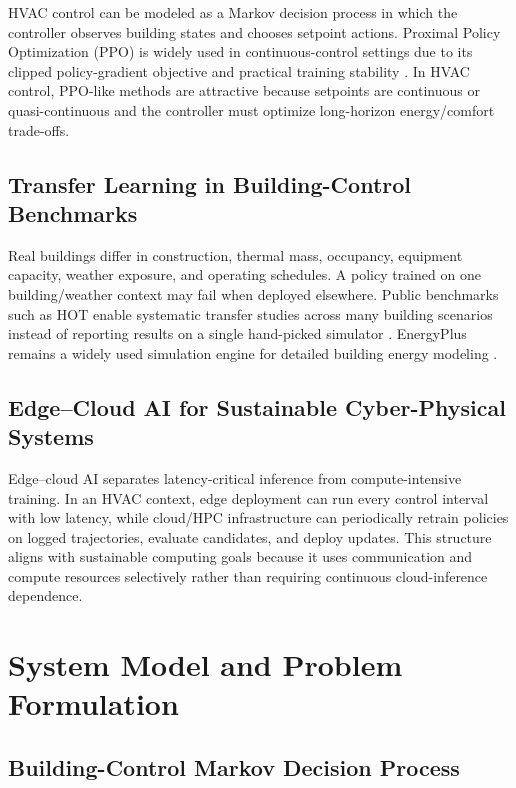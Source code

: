 \documentclass[11pt,a4paper]{article}
\begin{document}
HVAC control can be modeled as a Markov decision process in which the controller observes building states and chooses setpoint actions. Proximal Policy Optimization (PPO) is widely used in continuous-control settings due to its clipped policy-gradient objective and practical training stability \cite{schulman2017ppo}. In HVAC control, PPO-like methods are attractive because setpoints are continuous or quasi-continuous and the controller must optimize long-horizon energy/comfort trade-offs.

\subsection{Transfer Learning in Building-Control Benchmarks}

Real buildings differ in construction, thermal mass, occupancy, equipment capacity, weather exposure, and operating schedules. A policy trained on one building/weather context may fail when deployed elsewhere. Public benchmarks such as HOT enable systematic transfer studies across many building scenarios instead of reporting results on a single hand-picked simulator \cite{berkes2025hot}. EnergyPlus remains a widely used simulation engine for detailed building energy modeling \cite{crawley2001energyplus}.

\subsection{Edge--Cloud AI for Sustainable Cyber-Physical Systems}

Edge--cloud AI separates latency-critical inference from compute-intensive training. In an HVAC context, edge deployment can run every control interval with low latency, while cloud/HPC infrastructure can periodically retrain policies on logged trajectories, evaluate candidates, and deploy updates. This structure aligns with sustainable computing goals because it uses communication and compute resources selectively rather than requiring continuous cloud-inference dependence.

\section{System Model and Problem Formulation}

\subsection{Building-Control Markov Decision Process}
\end{document}
